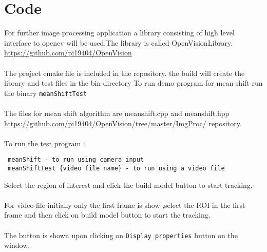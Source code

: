 \documentclass[fontsize=12pt, %
                             paper=a4, %
                             oneside, %
                             captions=tableheading,
                             index=totoc,
                             hyperref]{labbook}
\begin{document}
\section{Code}
For further image processing application a library consisting of high level
interface to opencv will be used.The library is called OpenVisionLibrary.
\url{https://github.com/pi19404/OpenVision}
\\\\
The project cmake file is included in the repository.
the build will create the library and test files in the bin directory
To run demo program for mean shift run the binary \texttt{meanShiftTest}
\\\\
The files for mean shift algorithm are meanshift.cpp and meanshift.hpp
\url{https://github.com/pi19404/OpenVision/tree/master/ImgProc/}
repository.
\\\\
To run the test program :
\begin{verbatim}
 meanShift - to run using camera input
 meanShiftTest {video file name} - to run using a video file
\end{verbatim}
Select the region of interest and click the build model
button to start tracking.
\\\\
For video file initially only the first frame is show ,select
the ROI in the first frame and then click on build model button
to start the tracking.
\\\\
The button is shown upon clicking on \texttt{Display properties}
button on the window.
\end{document}
